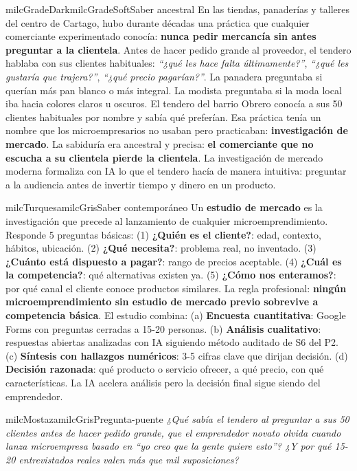 \documentclass[11pt,letterpaper]{article}
\begin{document}
\begin{softbox}{milcGradeDark}{milcGradeSoft}{Saber ancestral}
En las tiendas, panaderías y talleres del centro de Cartago, hubo durante décadas una práctica que cualquier comerciante experimentado conocía: \textbf{nunca pedir mercancía sin antes preguntar a la clientela}. Antes de hacer pedido grande al proveedor, el tendero hablaba con sus clientes habituales: \emph{``¿qué les hace falta últimamente?''}, \emph{``¿qué les gustaría que trajera?''}, \emph{``¿qué precio pagarían?''}. La panadera preguntaba si querían más pan blanco o más integral. La modista preguntaba si la moda local iba hacia colores claros u oscuros. El tendero del barrio Obrero conocía a sus 50 clientes habituales por nombre y sabía qué preferían. Esa práctica tenía un nombre que los microempresarios no usaban pero practicaban: \textbf{investigación de mercado}. La sabiduría era ancestral y precisa: \textbf{el comerciante que no escucha a su clientela pierde la clientela}. La investigación de mercado moderna formaliza con IA lo que el tendero hacía de manera intuitiva: preguntar a la audiencia antes de invertir tiempo y dinero en un producto.
\end{softbox}

\begin{softbox}{milcTurquesa}{milcGris}{Saber contemporáneo}
Un \textbf{estudio de mercado} es la investigación que precede al lanzamiento de cualquier microemprendimiento. Responde 5 preguntas básicas: (1) \textbf{¿Quién es el cliente?}: edad, contexto, hábitos, ubicación. (2) \textbf{¿Qué necesita?}: problema real, no inventado. (3) \textbf{¿Cuánto está dispuesto a pagar?}: rango de precios aceptable. (4) \textbf{¿Cuál es la competencia?}: qué alternativas existen ya. (5) \textbf{¿Cómo nos enteramos?}: por qué canal el cliente conoce productos similares. La regla profesional: \textbf{ningún microemprendimiento sin estudio de mercado previo sobrevive a competencia básica}. El estudio combina: (a) \textbf{Encuesta cuantitativa}: Google Forms con preguntas cerradas a 15-20 personas. (b) \textbf{Análisis cualitativo}: respuestas abiertas analizadas con IA siguiendo método auditado de S6 del P2. (c) \textbf{Síntesis con hallazgos numéricos}: 3-5 cifras clave que dirijan decisión. (d) \textbf{Decisión razonada}: qué producto o servicio ofrecer, a qué precio, con qué características. La IA acelera análisis pero la decisión final sigue siendo del emprendedor.
\end{softbox}

\begin{softbox}{milcMostaza}{milcGris}{Pregunta-puente}
\textit{¿Qué sabía el tendero al preguntar a sus 50 clientes antes de hacer pedido grande, que el emprendedor novato olvida cuando lanza microempresa basado en \emph{``yo creo que la gente quiere esto''}? ¿Y por qué 15-20 entrevistados reales valen más que mil suposiciones?}
\end{softbox}
\end{document}

